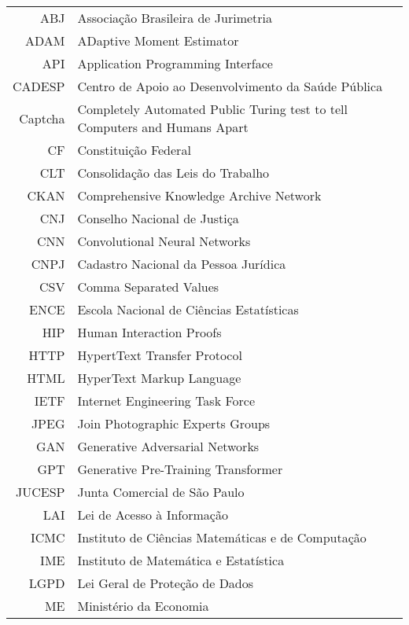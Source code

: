 \documentclass[12pt,twoside,brazilian]{book}
\begin{document}
\begin{tabular}{rl}
   ABJ & Associação Brasileira de Jurimetria\\
   ADAM & ADaptive Moment Estimator\\
   API & Application Programming Interface\\
   CADESP & Centro de Apoio ao Desenvolvimento da Saúde Pública\\
   Captcha & Completely Automated Public Turing test to tell Computers and Humans Apart\\
   CF & Constituição Federal\\
   CLT & Consolidação das Leis do Trabalho\\
   CKAN & Comprehensive Knowledge Archive Network\\
   CNJ & Conselho Nacional de Justiça\\
   CNN & Convolutional Neural Networks\\
   CNPJ & Cadastro Nacional da Pessoa Jurídica\\
   CSV & Comma Separated Values\\
   ENCE & Escola Nacional de Ciências Estatísticas\\
   HIP & Human Interaction Proofs\\
   HTTP & HypertText Transfer Protocol\\
   HTML & HyperText Markup Language\\
   IETF & Internet Engineering Task Force\\
   JPEG & Join Photographic Experts Groups\\
   GAN & Generative Adversarial Networks\\
   GPT & Generative Pre-Training Transformer\\
   JUCESP & Junta Comercial de São Paulo\\
   LAI & Lei de Acesso à Informação\\
   ICMC & Instituto de Ciências Matemáticas e de Computação\\
   IME & Instituto de Matemática e Estatística\\
   LGPD & Lei Geral de Proteção de Dados\\
   ME & Ministério da Economia\\
\end{tabular}
\end{document}
